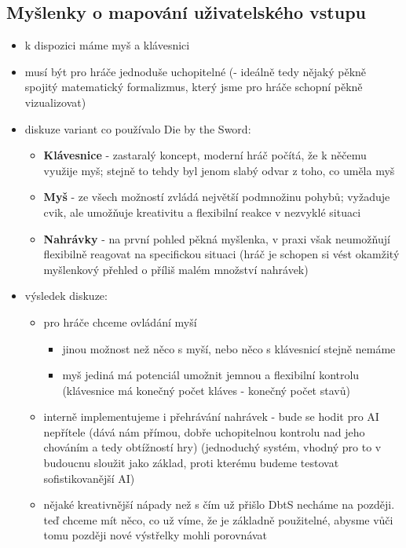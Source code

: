 \subsection{Myšlenky o mapování uživatelského vstupu}
\begin{itemize}
    \item k dispozici máme myš a klávesnici
    \item musí být pro hráče jednoduše uchopitelné (- ideálně tedy nějaký pěkně spojitý matematický formalizmus, který jsme pro hráče schopní pěkně vizualizovat)
    \item diskuze variant co používalo Die by the Sword:
        \begin{itemize}
            \item \textbf{Klávesnice} - zastaralý koncept, moderní hráč počítá, že k něčemu využije myš; stejně to tehdy byl jenom slabý odvar z toho, co uměla myš
            \item \textbf{Myš} - ze všech možností zvládá největší podmnožinu pohybů; vyžaduje cvik, ale umožňuje kreativitu a flexibilní reakce v nezvyklé situaci
            \item \textbf{Nahrávky} - na první pohled pěkná myšlenka, v praxi však neumožňují flexibilně reagovat na specifickou situaci (hráč je schopen si vést okamžitý myšlenkový přehled o příliš malém množství nahrávek)
        \end{itemize}
    \item výsledek diskuze:
        \begin{itemize}
            \item pro hráče chceme ovládání myší
            \begin{itemize}
                \item jinou možnost než něco s myší, nebo něco s klávesnicí stejně nemáme
                \item myš jediná má potenciál umožnit jemnou a flexibilní kontrolu (klávesnice má konečný počet kláves - konečný počet stavů)
            \end{itemize}
            \item interně implementujeme i přehrávání nahrávek - bude se hodit pro AI nepřítele (dává nám přímou, dobře uchopitelnou kontrolu nad jeho chováním a tedy obtížností hry) (jednoduchý systém, vhodný pro to v budoucnu sloužit jako základ, proti kterému budeme testovat sofistikovanější AI)
            \item nějaké kreativnější nápady než s čím už přišlo DbtS necháme na později. teď chceme mít něco, co už víme, že je základně použitelné, abysme vůči tomu později nové výstřelky mohli porovnávat

\end{itemize}
\end{itemize}
